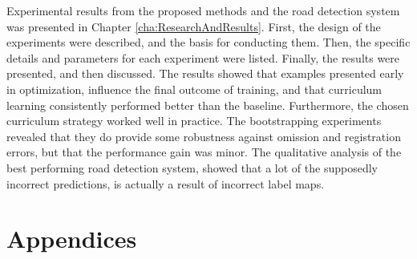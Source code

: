 \documentclass[a4paper]{book}
\begin{document}
Experimental results from the proposed methods and the road detection system was presented in Chapter \ref{cha:ResearchAndResults}. First, the design of the experiments were described, and the basis for conducting them. Then, the specific details and parameters for each experiment were listed. Finally, the results were presented, and then discussed. The results showed that examples presented early in optimization, influence the final outcome of training, and that curriculum learning consistently performed better than the baseline. Furthermore, the chosen curriculum strategy worked well in practice. The bootstrapping experiments revealed that they do provide some robustness against omission and registration errors, but that the performance gain was minor. The qualitative analysis of the best performing road detection system, showed that a lot of the supposedly incorrect predictions, is actually a result of incorrect label maps.\\







\backmatter


\appendix
\chapter*{Appendices}
\renewcommand{\thesection}{\Alph{section}}




\end{document}

